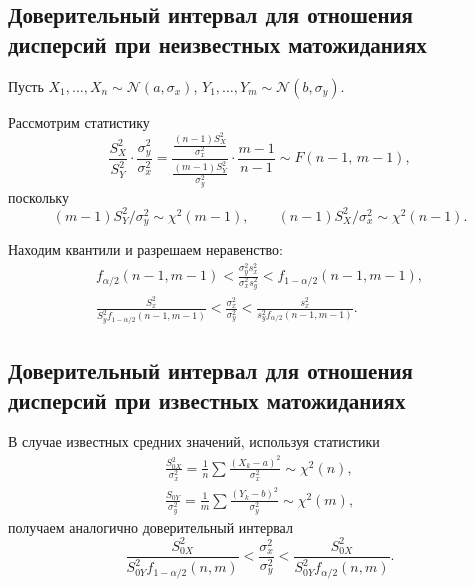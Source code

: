 \subsection{Доверительный интервал для отношения дисперсий при неизвестных матожиданиях}
\begin{ex}
Пусть $X_1, \dots, X_n \sim \mathscr N(a, \sigma_x)$, $Y_1, \dots, Y_m
\sim\mathscr N(b, \sigma_y)$.

Рассмотрим статистику  
\[
		\frac{S^2_X}{S^2_Y}\cdot \frac{\sigma^2_y}{\sigma^2_x} =
		\frac{\frac{(n-1)S^2_X}{\sigma^2_x}}{\frac{(m-1)S^2_Y}{\sigma^2_y}} \cdot
		\frac{m-1}{n-1} \sim F(n-1,\,m-1),
\]
поскольку
\[
(m-1) S_Y^2 / \sigma_y^2 \sim \chi^2(m-1),\qquad (n-1) S_X^2 / \sigma_x^2 \sim
\chi^2(n-1).
\]

Находим квантили и разрешаем неравенство:
\begin{gather*}
f_{\alpha/2} (n-1, m-1) < \frac{\sigma_y^2 s_x^2}{\sigma_x^2 s_y^2} <
f_{1-\alpha/2} (n-1, m-1), \\
\frac{S_x^2}{S_y^2 f_{1-\alpha/2} (n-1, m-1)} < \frac{\sigma_x^2}{\sigma_y^2} <
\frac{s_x^2}{s_y^2 f_{\alpha/2} (n-1, m-1)}.
\end{gather*}
\end{ex}


\subsection{Доверительный интервал для отношения дисперсий при известных матожиданиях}
\begin{ex}
	В случае известных средних значений, используя статистики
\begin{gather*}
  \frac{S_{0X}^2}{\sigma_x^2} = \frac{1}{n}\sum \frac{(X_k-a)^2}{\sigma_x^2}\sim
	\chi^2(n), \\
  \frac{S_{0Y}}{\sigma_y^2} = \frac{1}{m} \sum \frac{(Y_k - b)^2}{\sigma_y^2}
	\sim \chi^2 (m),
\end{gather*}
получаем аналогично доверительный интервал
\[
	\frac{S_{0X}^2}{S_{0Y}^2 f_{1-\alpha/2}(n,m)} < \frac{\sigma_x^2}{\sigma_y^2}
	< \frac{S_{0X}^2}{S_{0Y}^2 f_{\alpha/2}(n,m)}.
\]

\end{ex}
